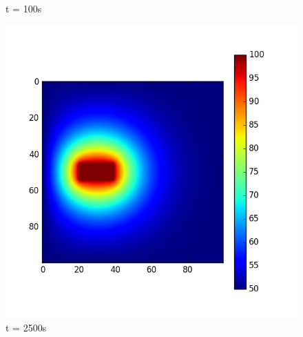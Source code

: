 \documentclass{article}
\begin{document}
\begin{figure}[H]
  \caption{t = 100s}\label{fig:awesome_image2}
\endminipage\hfill
{}%
  \includegraphics[width=\linewidth]{fijasCte2500.png}
  \caption{t = 2500s}\label{fig:awesome_image3}
\endminipage
\end{figure}
\end{document}

